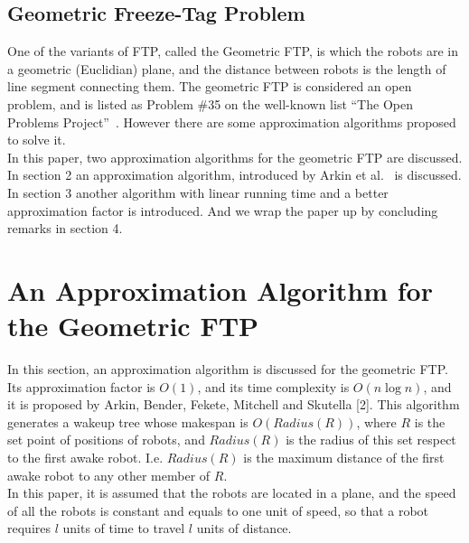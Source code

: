 \documentclass{cccg12}
\begin{document}
\subsection{Geometric Freeze-Tag Problem}
One of the variants of FTP, called the Geometric FTP, is which the robots are in a geometric (Euclidian) plane, and the distance between robots is the length of line segment connecting them. The geometric FTP is considered an open problem, and is listed as Problem \#35 on the well-known list ``The Open Problems Project''~\cite{OpenProblems}. However there are some approximation algorithms proposed to solve it.\\
In this paper, two approximation algorithms for the geometric FTP are discussed. In section 2 an approximation algorithm, introduced by Arkin et al.~\cite{Arkin2006} is discussed. In section 3 another algorithm with linear running time and a better approximation factor is introduced. And we wrap the paper up by concluding remarks in section 4.


\section{An Approximation Algorithm for the Geometric FTP}
In this section, an approximation algorithm is discussed for the geometric FTP. Its approximation factor is ${ O(1) }$, and its time complexity is ${ O(n\log n) }$, and it is proposed by Arkin, Bender, Fekete, Mitchell and Skutella [2]. This algorithm generates a wakeup tree whose makespan is ${ O(Radius(R)) }$, where $R$ is the set point of positions of robots, and ${ Radius(R) }$ is the radius of this set respect to the first awake robot. I.e. ${ Radius(R) }$ is the maximum distance of the first awake robot to any other member of $R$.\\
In this paper, it is assumed that the robots are located in a plane, and the speed of all the robots is constant and equals to one unit of speed, so that a robot requires $l$ units of time to travel $l$ units of distance.
\end{document}

